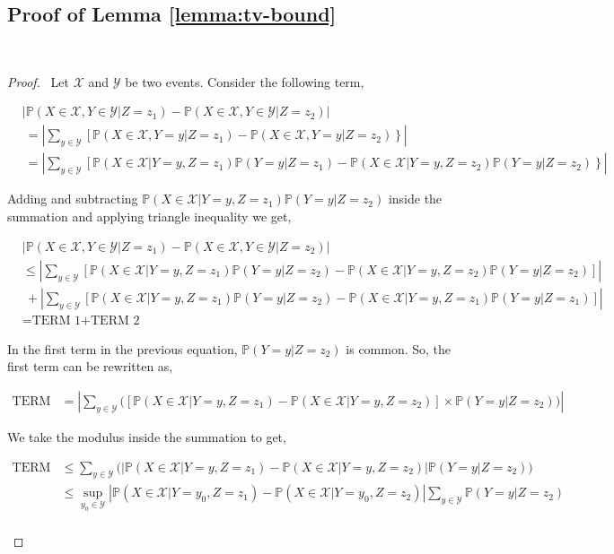 \documentclass[opre,sglanonrev]{informs4}
\numberwithin{equation}{section}
\newcommand{\rc}{\right\}}
\newcommand{\lb}{\left[}
\newcommand{\rb}{\right]}
\newcommand{\lv}{\left|}
\newcommand{\rv}{\right|}
\newcommand{\Pbb}{\mathbb{P}}
\newcommand{\Xcal}{\mathcal{X}}
\newcommand{\Ycal}{\mathcal{Y}}
\newcommand{\prob}{\Pbb}
\begin{document}
\begin{APPENDICES}
\subsection{Proof of Lemma \ref{lemma:tv-bound}}~\label{sec:prf-tvbd}
\begin{proof}\
Let $\Xcal$ and $\Ycal$ be two events.
Consider the following term,
\begin{small}
\begin{align*}
    & \lv\prob(X\in\Xcal,Y\in\Ycal|Z=z_1)-\prob(X\in\Xcal,Y\in\Ycal|Z=z_2)\rv\\
    & \ =\lv \sum_{y\in\Ycal}\lb \prob(X\in\Xcal,Y=y|Z=z_1)-\prob(X\in\Xcal,Y= y|Z=z_2)\rc \rv\\
    & \ =\lv \sum_{y\in\Ycal}\lb \prob(X\in\Xcal|Y= y,Z=z_1)\prob(Y=y|Z=z_1)-\prob(X\in\Xcal|Y=y,Z=z_2)\prob(Y=y|Z=z_2)\rc \rv
\end{align*}
\end{small}
Adding and subtracting $\prob(X\in\Xcal|Y=y,Z=z_1)\prob(Y=y|Z=z_2)$ inside the summation and applying triangle inequality we get,
\begin{small}
\begin{align*}
    & \lv\prob(X\in\Xcal,Y\in\Ycal|Z=z_1)-\prob(X\in\Xcal,Y\in\Ycal|Z=z_2)\rv\\
    & \leq \lv \sum_{y\in\Ycal}\lb \prob(X\in\Xcal|Y=y,Z=z_1)\prob(Y=y|Z=z_2)-\prob(X\in\Xcal|Y=y,Z=z_2)\prob(Y=y|Z=z_2)\rb \rv\\
    & \ + \left| \sum_{y\in\Ycal}\lb \prob(X\in\Xcal|Y=y,Z=z_1)\prob(Y=y|Z=z_2)-\prob(X\in\Xcal|Y=y,Z=z_1)\prob(Y=y|Z=z_1)\rb \right|\\
    & =\text{TERM 1+TERM 2}
\end{align*}
\end{small}
In the first term in the previous equation, $\prob(Y=y|Z=z_2)$ is common. So, the first term can be rewritten as,
\begin{small}
\begin{align*}
    \text{TERM 1} & = \lv \sum_{y\in\Ycal}\bigg(\lb \prob(X\in\Xcal|Y=y,Z=z_1)-\prob(X\in\Xcal|Y=y,Z=z_2)\rb\times \prob(Y=y|Z=z_2)\bigg) \rv
\end{align*}
\end{small}
We take the modulus inside the summation to get,
\begin{small}
\begin{align*}
 \text{TERM 1} & \leq \sum_{y\in\Ycal}\bigg(\lv \prob(X\in\Xcal|Y=y,Z=z_1)-\prob(X\in\Xcal|Y=y,Z=z_2)\rv \prob(Y=y|Z=z_2)\bigg) \\
    & \leq \sup_{y_0\in \Ycal} \lv \prob(X\in\Xcal|Y=y_0,Z=z_1)-\prob(X\in\Xcal|Y=y_0,Z=z_2)\rv \sum_{y\in\Ycal}\prob(Y=y|Z=z_2)\\

\end{align*}
\end{small}
\end{proof}
\end{APPENDICES}
\end{document}
